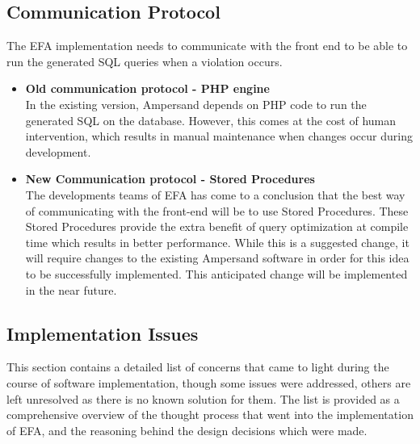 \subsection{Communication Protocol}
The EFA implementation needs to communicate with the front end to be able to 
run the generated SQL queries when a violation occurs. 
\begin{itemize}
    \item \textbf{Old communication protocol -  PHP engine} \\
    In the existing version, Ampersand depends on PHP code to run the 
    generated SQL on the database. However, this comes at the cost of 
    human intervention, which results in manual maintenance when 
    changes occur during development. 
    \item \textbf{New Communication protocol - Stored Procedures} \\
    The developments teams of EFA has come to a conclusion that the 
    best way of communicating with the front-end will be to use Stored 
    Procedures\cite{SP}. These Stored Procedures provide the extra 
    benefit of query optimization at compile time which results in 
    better performance. While this is a suggested change, it will 
    require changes to the existing Ampersand software in order for 
    this idea to be successfully implemented. This anticipated 
    change will be implemented in the near future.
    
\end{itemize}

\subsection{Implementation Issues}

This section contains a detailed list of concerns that came to light during the 
course of software implementation, though some issues were addressed, others 
are left unresolved as there is no known solution for them. The list is 
provided as a comprehensive overview of the thought process that went into the 
implementation of EFA, and the reasoning behind the design decisions which were 
made.


